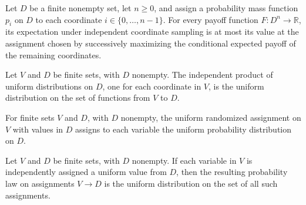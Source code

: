 \begin{theorem}
\label{FABL.pmfExpectation_le_conditionalExpectationAssignment}
\leanok
{}
Let $D$ be a finite nonempty set, let $n\geq 0$, and assign a probability mass function
$p_i$ on $D$ to each coordinate $i\in\{0,\ldots,n-1\}$. For every payoff function
$F:D^n\to\mathbb{R}$, its expectation under independent coordinate sampling is at most
its value at the assignment chosen by successively maximizing the conditional expected
payoff of the remaining coordinates.
\end{theorem}

\begin{theorem}
\label{FABL.independentProductPMF_uniform}
\leanok
{}
Let $V$ and $D$ be finite sets, with $D$ nonempty. The independent product of uniform
distributions on $D$, one for each coordinate in $V$, is the uniform distribution on the
set of functions from $V$ to $D$.
\end{theorem}

\begin{definition}
\label{FABL.uniformRandomizedAssignment}
\leanok
{}
For finite sets $V$ and $D$, with $D$ nonempty, the uniform randomized assignment on $V$
with values in $D$ assigns to each variable the uniform probability distribution on $D$.
\end{definition}

\begin{theorem}
\label{FABL.uniformRandomizedAssignment_sampleLaw}
\leanok
{}
Let $V$ and $D$ be finite sets, with $D$ nonempty. If each variable in $V$ is
independently assigned a uniform value from $D$, then the resulting probability law on
assignments $V\to D$ is the uniform distribution on the set of all such assignments.
\end{theorem}

